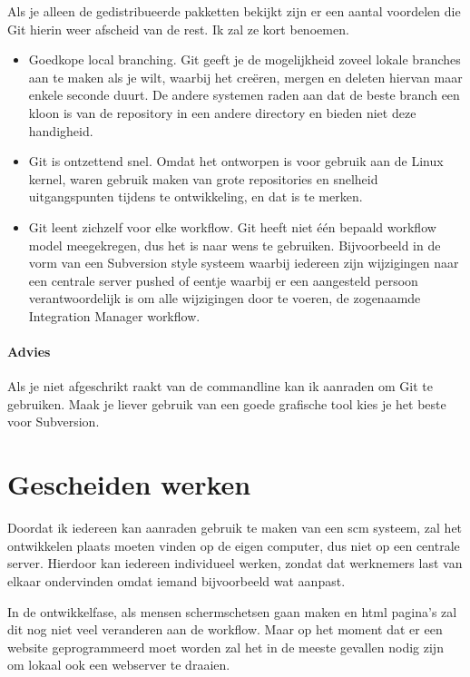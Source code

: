Als je alleen de gedistribueerde pakketten bekijkt zijn er een aantal voordelen die Git hierin weer afscheid van de rest. Ik zal ze kort benoemen.

\begin{itemize}
  \item Goedkope local branching. Git geeft je de mogelijkheid zoveel lokale branches aan te maken als je wilt, waarbij het cre\"{e}ren, mergen en deleten hiervan maar enkele seconde duurt. De andere systemen raden aan dat de beste branch een kloon is van de repository in een andere directory en bieden niet deze handigheid.
  \item Git is ontzettend snel\cite{whygitisbetterthanx}. Omdat het ontworpen is voor gebruik aan de Linux kernel, waren gebruik maken van grote repositories en snelheid uitgangspunten tijdens te ontwikkeling, en dat is te merken.
  \item Git leent zichzelf voor elke workflow. Git heeft niet \'{e}\'{e}n bepaald workflow model meegekregen, dus het is naar wens te gebruiken. Bijvoorbeeld in de vorm van een Subversion style systeem waarbij iedereen zijn wijzigingen naar een centrale server pushed of eentje waarbij er een aangesteld persoon verantwoordelijk is om alle wijzigingen door te voeren, de zogenaamde Integration Manager workflow.
\end{itemize}

\paragraph{Advies} Als je niet afgeschrikt raakt van de commandline kan ik aanraden om Git te gebruiken. Maak je liever gebruik van een goede grafische tool kies je het beste voor Subversion.

\section{Gescheiden werken}

Doordat ik iedereen kan aanraden gebruik te maken van een {\sc scm} systeem, zal het ontwikkelen plaats moeten vinden  op de eigen computer, dus niet op een centrale server. Hierdoor kan iedereen individueel werken, zondat dat werknemers last van elkaar ondervinden omdat iemand bijvoorbeeld wat aanpast.

In de ontwikkelfase, als mensen schermschetsen gaan maken en html pagina's zal dit nog niet veel veranderen aan de workflow. Maar op het moment dat er een website geprogrammeerd moet worden zal het in de meeste gevallen nodig zijn om lokaal ook een webserver te draaien. 

